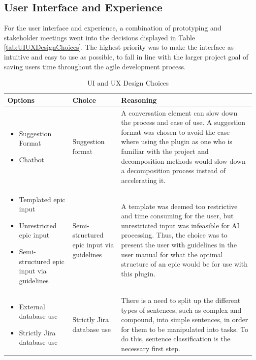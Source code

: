 \subsection{User Interface and Experience}
For the user interface and experience, a combination of prototyping and stakeholder meetings went into the decisions displayed in Table \ref{tab:UIUXDesignChoices}. The highest priority was to make the interface as intuitive and easy to use as possible, to fall in line with the larger project goal of saving users time throughout the agile development process.
\begin{table}[!h]
	\caption{UI and UX Design Choices}
	\begin{tabularx}{\textwidth}{|p{3cm}|p{3cm}|X|}
	\hline
	Options & Choice & Reasoning\\
	\hline
	\begin{itemize}
		\item Suggestion Format
		\item Chatbot
	\end{itemize} &
	Suggestion format & A conversation element can slow down the process and ease of use. A suggestion format was chosen to avoid the case where using the plugin as one who is familiar with the project and decomposition methods would slow down a decomposition process instead of accelerating it.\\
	\hline
	\begin{itemize}
		\item Templated epic input
		\item Unrestricted epic input
		\item Semi-structured epic input via guidelines
	\end{itemize} &
	Semi-structured epic input via guidelines & A template was deemed too restrictive and time consuming for the user, but unrestricted input was infeasible for AI processing. Thus, the choice was to present the user with guidelines in the user manual for what the optimal structure of an epic would be for use with this plugin.\\
	\hline	
	\begin{itemize}
		\item External database use
		\item Strictly Jira database use
	\end{itemize} & 
	Strictly Jira database use & There is a need to split up the different types of sentences, such as complex and compound, into simple sentences, in order for them to be manipulated into tasks. To do this, sentence classification is the necessary first step.\\

\end{tabularx}
\end{table}
